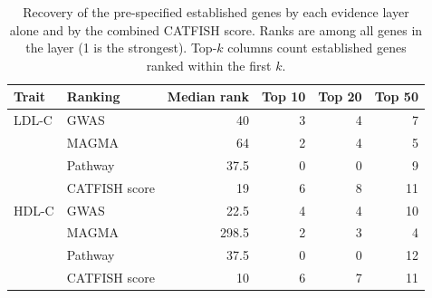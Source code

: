 \begin{table}[!t]
\centering
\caption{Recovery of the pre-specified established genes by each evidence layer alone and by the combined CATFISH score. Ranks are among all genes in the layer (1 is the strongest). Top-$k$ columns count established genes ranked within the first $k$.}
\label{tab:lipid_recovery}
\small
\begin{tabular}{llrrrr}
\hline
\textbf{Trait} & \textbf{Ranking} & \textbf{Median rank} & \textbf{Top 10} & \textbf{Top 20} & \textbf{Top 50} \\
\hline
LDL-C & GWAS & 40 & 3 & 4 & 7 \\
 & MAGMA & 64 & 2 & 4 & 5 \\
 & Pathway & 37.5 & 0 & 0 & 9 \\
 & CATFISH score & 19 & 6 & 8 & 11 \\
\hline
HDL-C & GWAS & 22.5 & 4 & 4 & 10 \\
 & MAGMA & 298.5 & 2 & 3 & 4 \\
 & Pathway & 37.5 & 0 & 0 & 12 \\
 & CATFISH score & 10 & 6 & 7 & 11 \\
\hline
\end{tabular}
\end{table}
